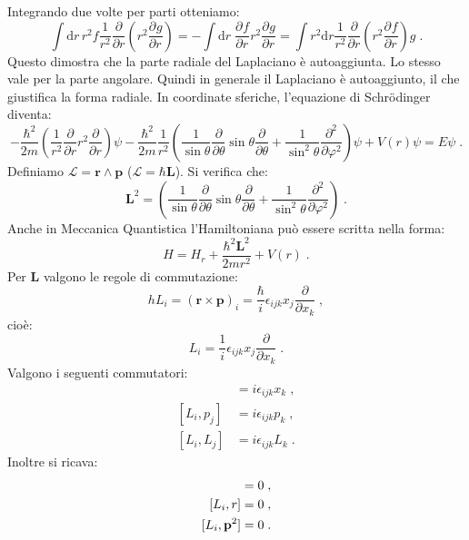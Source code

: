 \documentclass[10pt,a4paper]{report}
\theoremstyle{definition}
\newcommand{\pdev}[3][]{\frac{\partial^{#1} #2}{\partial #3^{#1}}}
\newcommand{\lag}{\mathcal{L}}
\numberwithin{equation}{section}
\newcommand{\diff}[1][]{\mathrm{d}#1}
\newcommand{\Sch}{Schrödinger}
\begin{document}
Integrando due volte per parti otteniamo:
\begin{equation}
\int\diff{r}\,r^2f\frac{1}{r^2}\frac{\partial}{\partial r}\left(r^2\pdev{g}{r}\right)=-\int\diff{r}\;\pdev{f}{r}r^2\pdev{g}{r}=\int r^2\diff{r}\frac{1}{r^2}\frac{\partial}{\partial r}\left(r^2\pdev{f}{r}\right) g\;.
\end{equation}
Questo dimostra che la parte radiale del Laplaciano è autoaggiunta. Lo stesso vale per la parte angolare. Quindi in generale il Laplaciano è autoaggiunto, il che giustifica la forma radiale. In coordinate sferiche, l'equazione di \Sch \, diventa:
\begin{equation}
-\frac{\hbar^2}{2m}\left(\frac{1}{r^2}\frac{\partial}{\partial r}r^2\frac{\partial}{\partial r}\right)\psi-
\frac{\hbar^2}{2m}\frac{1}{r^2}\left(\frac{1}{\sin\theta}\frac{\partial}{\partial\theta}\sin\theta\frac{\partial}{\partial\theta}+\frac{1}{\sin^2\theta}\frac{\partial^2}{\partial\varphi^2}\right)\psi+V(r)\psi=E\psi\;.
\end{equation}
Definiamo $\boldsymbol{\lag}=\mathbf{r}\wedge\mathbf{p}$ ($\boldsymbol{\lag}=\hbar\mathbf{L}$). Si verifica che:
\begin{equation}
\mathbf{L}^2=\left(\frac{1}{\sin\theta}\frac{\partial}{\partial\theta}\sin\theta\frac{\partial}{\partial\theta}+\frac{1}{\sin^2\theta}\frac{\partial^2}{\partial\varphi^2}\right)\;.
\end{equation}
Anche in Meccanica Quantistica l'Hamiltoniana può essere scritta nella forma:
\begin{equation}
H=H_r+\frac{\hbar^2\mathbf{L}^2}{2mr^2}+V(r)\;.
\end{equation}
Per $\mathbf{L}$ valgono le regole di commutazione:
\begin{equation*}
hL_i=(\mathbf{r}\times\mathbf{p})_i=\frac{\hbar}{i}\epsilon_{ijk}x_j\frac{\partial}{\partial x_k}\;,
\end{equation*}
cioè:
\begin{equation}
L_i=\frac{1}{i}\epsilon_{ijk}x_j\frac{\partial}{\partial x_k}\;.
\end{equation}
Valgono i seguenti commutatori:
\begin{align}
[L_i,x_j]&=i\epsilon_{ijk}x_k\;, \\
[L_i,p_j]&=i\epsilon_{ijk}p_k\;, \\
[L_i,L_j]&=i\epsilon_{ijk}L_k\;.
\end{align}
Inoltre si ricava:
\begin{align}
[L_i,\mathbf{L}^2] &= 0\;, \notag \\
[L_i,r] &= 0 \notag\;, \\
[L_i,\mathbf{p}^2]&=0\;.
\end{align}
\end{document}
